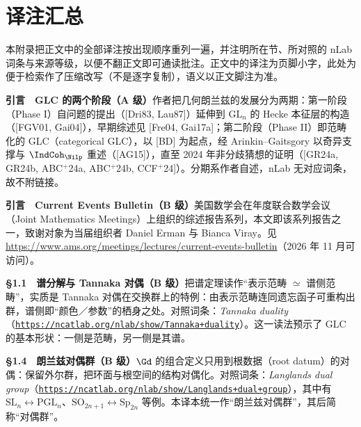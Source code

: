 \clearpage
\section*{译注汇总}

本附录把正文中的全部译注按出现顺序重列一遍，并注明所在节、所对照的 nLab 词条与来源等级，以便不翻正文即可通读批注。正文中的译注为页脚小字，此处为便于检索作了压缩改写（不是逐字复制），语义以正文脚注为准。

\medskip
\noindent\textbf{引言　GLC 的两个阶段（A 级）}\quad 作者把几何朗兰兹的发展分为两期：第一阶段（Phase I）自问题的提出（[Dri83, Lau87]）延伸到 $\mathrm{GL}_{n}$ 的 Hecke 本征层的构造（[FGV01, Gai04]），早期综述见 [Fre04, Gai17a]；第二阶段（Phase II）即范畴化的 GLC（categorical GLC），以 [BD] 为起点，经 Arinkin--Gaitsgory 以奇异支撑与 $\IndCoh_{\Nilp}$ 重述（[AG15]），直至 2024 年非分歧猜想的证明（[GR24a, GR24b, ABC${}^{+}$24a, ABC${}^{+}$24b, CCF${}^{+}$24]）。分期系作者自述，nLab 无对应词条，故不附链接。

\smallskip
\noindent\textbf{引言　Current Events Bulletin（B 级）}\quad 美国数学会在年度联合数学会议（Joint Mathematics Meetings）上组织的综述报告系列，本文即该系列报告之一，致谢对象为当届组织者 Daniel Erman 与 Bianca Viray。见 \url{https://www.ams.org/meetings/lectures/current-events-bulletin}（2026 年 11 月可访问）。

\smallskip
\noindent\textbf{§1.1　谱分解与 Tannaka 对偶（B 级）}\quad 把谱定理读作“表示范畴 $\simeq$ 谱侧范畴”，实质是 Tannaka 对偶在交换群上的特例：由表示范畴连同遗忘函子可重构出群，谱侧即“颜色／参数”的栖身之处。对照词条：\emph{Tannaka duality}（\href{https://ncatlab.org/nlab/show/Tannaka+duality}{\texttt{https:/\allowbreak{}/\allowbreak{}ncatlab.\allowbreak{}org/\allowbreak{}nlab/\allowbreak{}show/\allowbreak{}Tannaka+\allowbreak{}duality}}）。这一读法预示了 GLC 的基本形状：一侧是范畴，另一侧是其谱。

\smallskip
\noindent\textbf{§1.4　朗兰兹对偶群（B 级）}\quad $\Gd$ 的组合定义只用到根数据（root datum）的对偶：保留外尔群，把环面与根空间的结构对偶化。对照词条：\emph{Langlands dual group}（\href{https://ncatlab.org/nlab/show/Langlands+dual+group}{\texttt{https:/\allowbreak{}/\allowbreak{}ncatlab.\allowbreak{}org/\allowbreak{}nlab/\allowbreak{}show/\allowbreak{}Langlands+\allowbreak{}dual+\allowbreak{}group}}），其中有 $\mathrm{SL}_{n}\leftrightarrow\mathrm{PGL}_{n}$、$\mathrm{SO}_{2n+1}\leftrightarrow\mathrm{Sp}_{2n}$ 等例。本译本统一作“朗兰兹对偶群”，其后简称“对偶群”。

